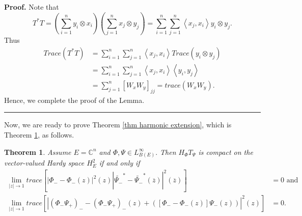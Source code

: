 \documentclass{article}%
\newtheorem{theorem}{Theorem}[section]
\newenvironment{proof}[1][Proof]{\noindent\textbf{#1.} }{\ \rule{0.5em}{0.5em}}
\begin{document}
\begin{proof}
Note that%
\[
T^{\ast}T=\left(  \sum_{i=1}^{n}y_{i}\otimes x_{i}\right)  \left(  \sum
_{j=1}^{n}x_{j}\otimes y_{j}\right)  =\sum_{i=1}^{n}\sum_{j=1}^{n}\left\langle
x_{j},x_{i}\right\rangle y_{i}\otimes y_{j}.
\]
Thus%
\begin{align*}
Trace(T^{\ast}T)  &  =\sum_{i=1}^{n}\sum_{j=1}^{n}\left\langle x_{j}%
,x_{i}\right\rangle Trace\left(  y_{i}\otimes y_{j}\right) \\
&  =\sum_{i=1}^{n}\sum_{j=1}^{n}\left\langle x_{j},x_{i}\right\rangle
\left\langle y_{i},y_{j}\right\rangle \\
&  =\sum_{j=1}^{n}\left[  W_{x}W_{y}\right]  _{jj}=trace\left(  W_{x}%
W_{y}\right)  .
\end{align*}
Hence, we complete the proof of the Lemma.
\end{proof}

Now, we are ready to prove Theorem \ref{thm harmonic extension}, which is
Theorem \ref{Theorem 3.8}, as follows.

\begin{theorem}
\label{Theorem 3.8} Assume $E=\mathbb{C}^{n}$ and $\Phi,\Psi\in L_{B(E)}%
^{\infty}.$ Then $H_{\Phi}T_{\Psi}$ is compact on the vector-valued Hardy
space $H_{E}^{2}$ if and only if%
\begin{align*}
\lim_{\left\vert z\right\vert \rightarrow1}trace\left[  \left\vert \Phi
_{-}-\Phi_{-}(z)\right\vert ^{2}(z)\left\vert \widetilde{\Psi_{-}}^{\ast
}-\widetilde{\Psi_{-}}^{\ast}(\overline{z})\right\vert ^{2}(\overline
{z})\right]   &  =0\text{ and }\\
\lim_{\left\vert z\right\vert \rightarrow1}trace\left[  \left\vert \left(
\Phi_{-}\Psi_{+}\right)  _{-}-\left(  \Phi_{-}\Psi_{+}\right)  _{-}(z)+\left(
\left[  \Phi_{-}-\Phi_{-}(z)\right]  \Psi_{-}(z)\right)  \right\vert
^{2}(z)\right]   &  =0.
\end{align*}

\end{theorem}
\end{document}
